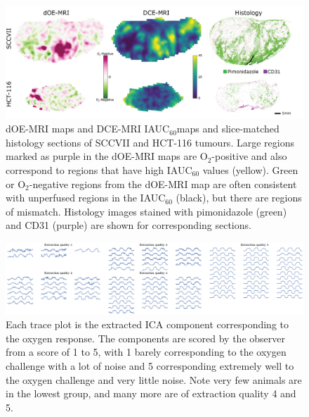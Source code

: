 \begin{figure}[htbp]
   \centering
   \includegraphics[width=\textwidth]{futurework/futurework-images/fig_perfusion.png} %
   \caption{\ac{dOE-MRI} maps and DCE-MRI IAUC$_{60}$maps and slice-matched histology sections of SCCVII and HCT-116 tumours. Large regions marked as purple in the \ac{dOE-MRI} maps are O$_2$-positive and also correspond to regions that have high IAUC$_{60}$ values (yellow). Green or O$_2$-negative regions from the \ac{dOE-MRI} map are often consistent with unperfused regions in the IAUC$_{60}$ (black), but there are regions of mismatch. Histology images stained with pimonidazole (green) and CD31 (purple) are shown for corresponding sections.
   \label{fig_perfusion}}
\end{figure}


\begin{figure}[htbp]
   \centering
   \includegraphics[width=\textwidth]{futurework/futurework-images/technical_ScoredExtractions.png} %
   \caption{Each trace plot is the extracted ICA component corresponding to the oxygen response. The components are scored by the observer from a score of 1 to 5, with 1 barely corresponding to the oxygen challenge with a lot of noise and 5 corresponding extremely well to the oxygen challenge and very little noise. Note very few animals are in the lowest group, and many more are of extraction quality 4 and 5.}
   \label{extractions}
\end{figure}





\endinput